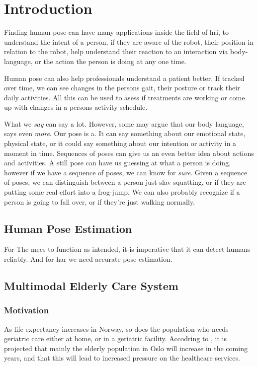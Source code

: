 \chapter{Introduction}

Finding human pose can have many applications inside the field of \gls{hri}, to understand the intent of a person, if they are aware of the robot, their position in relation to the robot, help understand their reaction to an interaction via body-language, or the action the person is doing at any one time.

Human pose can also help professionals understand a patient better. If tracked over time, we can see changes in the persons gait, their posture or track their daily activities. All this can be used to asess if treatments are working or come up with changes in a persons activity schedule.


What we \textit{say} can say a lot. However, some may argue that our body language, says even \textit{more}. Our pose is a. It can say something about our emotional state, physical state, or it could say something about our intention or activity in a moment in time. Sequences of poses can give us an even better idea about actions and activities. A still pose can have us guessing at what a person is doing, however if we have a sequence of poses, we can know for \textit{sure}. Given a sequence of poses, we can distinguish between a person just slav-squatting, or if they are putting some real effort into a frog-jump. We can also probably recognize if a person is going to fall over, or if they're just walking normally.




\section{Human Pose Estimation}
For The \gls{mecs} to function as intended, it is imperative that it can detect humans reliably. And for \gls{har} we need accurate pose estimation.

\section{Multimodal Elderly Care System}
\subsection{Motivation}
As life expectancy increases in Norway, so does the population who needs geriatric care either at home, or in a geriatric facility. Accodring to \cite{oslohelsa}, it is projected that mainly the elderly population in Oslo will increase in the coming years, and that this will lead to increased pressure on the healthcare services.

